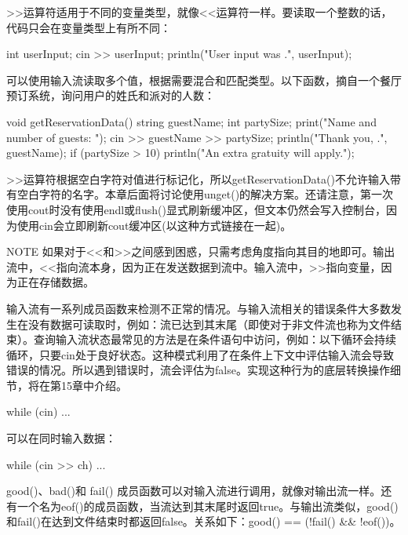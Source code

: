 >{}>运算符适用于不同的变量类型，就像<{}<运算符一样。要读取一个整数的话，代码只会在变量类型上有所不同：

\begin{cpp}
int userInput;
cin >> userInput;
println("User input was {}.", userInput);
\end{cpp}

可以使用输入流读取多个值，根据需要混合和匹配类型。以下函数，摘自一个餐厅预订系统，询问用户的姓氏和派对的人数：

\begin{cpp}
void getReservationData()
{
    string guestName;
    int partySize;
    print("Name and number of guests: ");
    cin >> guestName >> partySize;
    println("Thank you, {}.", guestName);
    if (partySize > 10) {
        println("An extra gratuity will apply.");
    }
}
\end{cpp}

>{}>运算符根据空白字符对值进行标记化，所以getReservationData()不允许输入带有空白字符的名字。本章后面将讨论使用unget()的解决方案。还请注意，第一次使用cout时没有使用endl或flush()显式刷新缓冲区，但文本仍然会写入控制台，因为使用cin会立即刷新cout缓冲区(以这种方式链接在一起)。

\begin{myNotic}{NOTE}
如果对于<{}<和>{}>之间感到困惑，只需考虑角度指向其目的地即可。输出流中，<{}<指向流本身，因为正在发送数据到流中。输入流中，>{}>指向变量，因为正在存储数据。
\end{myNotic}


输入流有一系列成员函数来检测不正常的情况。与输入流相关的错误条件大多数发生在没有数据可读取时，例如：流已达到其末尾（即使对于非文件流也称为文件结束）。查询输入流状态最常见的方法是在条件语句中访问，例如：以下循环会持续循环，只要cin处于良好状态。这种模式利用了在条件上下文中评估输入流会导致错误的情况。所以遇到错误时，流会评估为false。实现这种行为的底层转换操作细节，将在第15章中介绍。

\begin{cpp}
while (cin) { ... }
\end{cpp}

可以在同时输入数据：

\begin{cpp}
while (cin >> ch) { ... }
\end{cpp}

good()、bad()和 fail() 成员函数可以对输入流进行调用，就像对输出流一样。还有一个名为eof()的成员函数，当流达到其末尾时返回true。与输出流类似，good()和fail()在达到文件结束时都返回false。关系如下：good() == (!fail() \&\& !eof())。

